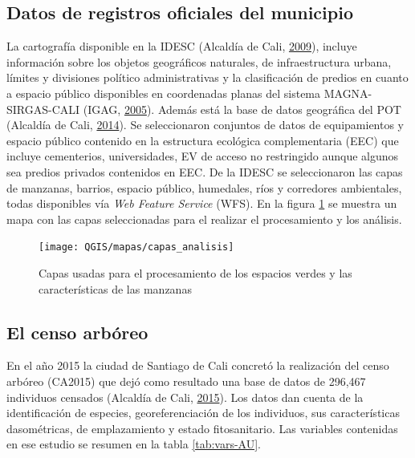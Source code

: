 \documentclass[12pt,a4paper,oneside, openany]{book}
\theoremstyle{definition}
\theoremstyle{definition}
\theoremstyle{definition}
\theoremstyle{remark}
\begin{document}
\subsection{Datos de registros oficiales del
municipio}\label{datos-de-registros-oficiales-del-municipio}

La cartografía disponible en la IDESC (Alcaldía de Cali,
\protect\hyperlink{ref-geoportal_idesc}{2009}), incluye información
sobre los objetos geográficos naturales, de infraestructura urbana,
límites y divisiones político administrativas y la clasificación de
predios en cuanto a espacio público disponibles en coordenadas planas
del sistema MAGNA-SIRGAS-CALI (IGAG,
\protect\hyperlink{ref-igagMC2005}{2005}). Además está la base de datos
geográfica del POT (Alcaldía de Cali,
\protect\hyperlink{ref-pot2014cali}{2014}). Se seleccionaron conjuntos
de datos de equipamientos y espacio público contenido en la estructura
ecológica complementaria (EEC) que incluye cementerios, universidades,
EV de acceso no restringido aunque algunos sea predios privados
contenidos en EEC. De la IDESC se seleccionaron las capas de manzanas,
barrios, espacio público, humedales, ríos y corredores ambientales,
todas disponibles vía \emph{Web Feature Service} (WFS). En la figura
\ref{fig:capas-idesc} se muestra un mapa con las capas seleccionadas
para el realizar el procesamiento y los análisis.

\begin{figure}[H]

{\centering \texttt{[image: QGIS/mapas/capas\_analisis]} 

}

\caption{Capas usadas para el procesamiento de los espacios verdes y las características de las manzanas}\label{fig:capas-idesc}
\end{figure}

\subsection{El censo arbóreo}\label{el-censo-arbuxf3reo}

En el año 2015 la ciudad de Santiago de Cali concretó la realización del
censo arbóreo (CA2015) que dejó como resultado una base de datos de
296,467 individuos censados (Alcaldía de Cali,
\protect\hyperlink{ref-ca2015cali}{2015}). Los datos dan cuenta de la
identificación de especies, georeferenciación de los individuos, sus
características dasométricas, de emplazamiento y estado fitosanitario.
Las variables contenidas en ese estudio se resumen en la tabla
\ref{tab:vars-AU}.
\end{document}
